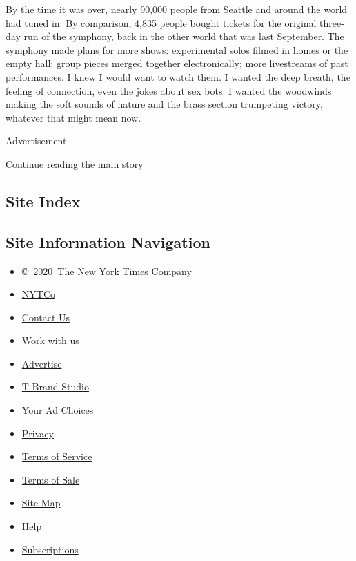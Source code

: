 By the time it was over, nearly 90,000 people from Seattle and around
the world had tuned in. By comparison, 4,835 people bought tickets for
the original three-day run of the symphony, back in the other world that
was last September. The symphony made plans for more shows: experimental
solos filmed in homes or the empty hall; group pieces merged together
electronically; more livestreams of past performances. I knew I would
want to watch them. I wanted the deep breath, the feeling of connection,
even the jokes about sex bots. I wanted the woodwinds making the soft
sounds of nature and the brass section trumpeting victory, whatever that
might mean now.

Advertisement

\protect\hyperlink{after-bottom}{Continue reading the main story}

\hypertarget{site-index}{%
\subsection{Site Index}\label{site-index}}

\hypertarget{site-information-navigation}{%
\subsection{Site Information
Navigation}\label{site-information-navigation}}

\begin{itemize}
\tightlist
\item
  \href{https://help.nytimes3xbfgragh.onion/hc/en-us/articles/115014792127-Copyright-notice}{©~2020~The
  New York Times Company}
\end{itemize}

\begin{itemize}
\tightlist
\item
  \href{https://www.nytco.com/}{NYTCo}
\item
  \href{https://help.nytimes3xbfgragh.onion/hc/en-us/articles/115015385887-Contact-Us}{Contact
  Us}
\item
  \href{https://www.nytco.com/careers/}{Work with us}
\item
  \href{https://nytmediakit.com/}{Advertise}
\item
  \href{http://www.tbrandstudio.com/}{T Brand Studio}
\item
  \href{https://www.nytimes3xbfgragh.onion/privacy/cookie-policy\#how-do-i-manage-trackers}{Your
  Ad Choices}
\item
  \href{https://www.nytimes3xbfgragh.onion/privacy}{Privacy}
\item
  \href{https://help.nytimes3xbfgragh.onion/hc/en-us/articles/115014893428-Terms-of-service}{Terms
  of Service}
\item
  \href{https://help.nytimes3xbfgragh.onion/hc/en-us/articles/115014893968-Terms-of-sale}{Terms
  of Sale}
\item
  \href{https://spiderbites.nytimes3xbfgragh.onion}{Site Map}
\item
  \href{https://help.nytimes3xbfgragh.onion/hc/en-us}{Help}
\item
  \href{https://www.nytimes3xbfgragh.onion/subscription?campaignId=37WXW}{Subscriptions}
\end{itemize}
